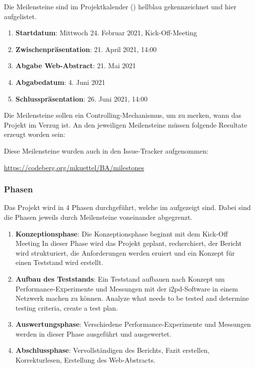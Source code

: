 Die Meilensteine sind im Projektkalender () hellblau gekennzeichnet und hier aufgelistet.

\begin{enumerate}
    \item \textbf{Startdatum}: Mittwoch 24. Februar 2021, Kick-Off-Meeting
    \item \textbf{Zwischenpräsentation}: 21. April 2021, 14:00
    \item \textbf{Abgabe Web-Abstract}: 21. Mai 2021
    \item \textbf{Abgabedatum}: 4. Juni 2021
    \item \textbf{Schlusspräsentation}: 26. Juni 2021, 14:00
\end{enumerate}

Die Meilensteine sollen ein Controlling-Mechanismus, um zu merken, wann das Projekt im Verzug ist.
An den jeweiligen Meilensteine müssen folgende Resultate erzeugt worden sein:


Diese Meilensteine wurden auch in den Issue-Tracker aufgenommen:

\url{https://codeberg.org/mkuettel/BA/milestones}

\subsubsection{Phasen}
\label{sec:phasen}

Das Projekt wird in 4 Phasen durchgeführt, welche im  aufgezeigt sind.
Dabei sind die Phasen jeweils durch Meilensteine voneinander abgegrenzt.

\begin{enumerate}
    \item \textbf{Konzeptionsphase}: Die Konzeptionsphase beginnt mit dem Kick-Off Meeting
        In dieser Phase wird das Projekt geplant, recherchiert, der Bericht wird strukturiert, die Anforderungen werden eruiert und  ein Konzept für einen Teststand wird erstellt.
    \item \textbf{Aufbau des Teststands}: Ein Teststand aufbauen nach Konzept um Performance-Experimente und Messungen mit der i2pd-Software in einem Netzwerk machen zu können.
Analyze what needs to be tested and determine testing criteria, create a test plan.
    \item \textbf{Auswertungsphase}: Verschiedene Performance-Experimente und Messungen werden in dieser Phase ausgeführt und ausgewertet.
    \item \textbf{Abschlussphase}: Vervollständigen des Berichts, Fazit erstellen, Korrekturlesen, Erstellung des Web-Abstracts.
\end{enumerate}

